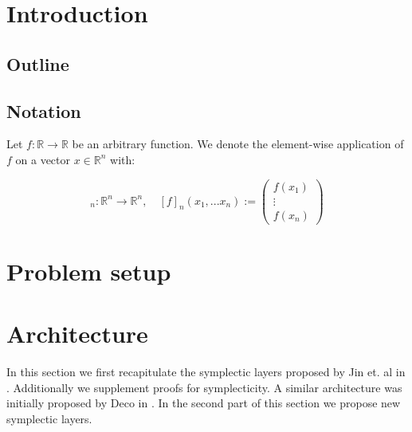 \documentclass[twoside,a4paper]{article}
\begin{document}
\section{Introduction}


\subsection{Outline}

\subsection{Notation}

Let $ f: \mathbb{R} \rightarrow \mathbb{R} $ be an arbitrary function. We denote
the element-wise application of $f$ on a vector $x \in \mathbb{R}^n$ with:

\begin{equation*}
	[f]_n: \mathbb{R}^n \rightarrow \mathbb{R}^n, \quad 
	[f]_n(x_1, ... x_n) := \begin{pmatrix}
		f(x_1) \\
		\vdots \\
		f(x_n)
	\end{pmatrix}
\end{equation*}


%
%
\newpage
\section{Problem setup}

\section{Architecture}

In this section we first recapitulate the symplectic layers proposed by Jin et. al 
in \cite{Jin2020} . Additionally we supplement proofs for 
symplecticity. A similar architecture was initially proposed by Deco in \cite{Deco1995} 
. In the second part of this section 
we propose new symplectic layers.
\end{document}
